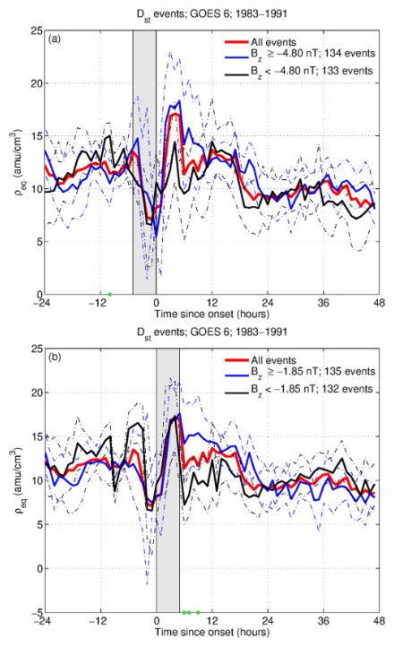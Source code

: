 \documentclass[12pt]{article}
\begin{document}
	\clearpage
	\begin{figure}[tp!]
		\centering
		\includegraphics[scale=0.40]{2016SW001507R-p05a.eps}
		\includegraphics[scale=0.40]{2016SW001507R-p05b.eps}
	\end{figure}
	
\end{document}
